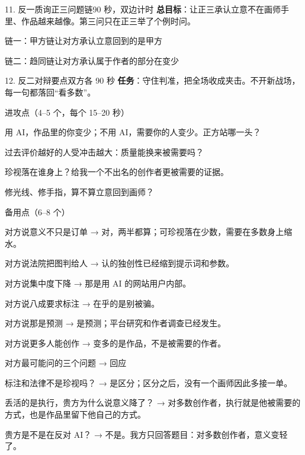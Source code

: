 \documentclass[script,con]{debate}
\begin{document}
\begin{stage}{11. 反一质询正三问题链}{90 秒，双边计时}
\textbf{总目标}：让正三承认立意不在画师手里、作品越来越像。第三问只在正三举了个例时问。
\begin{chain}{链一：甲方链}{让对方承认立意回到的是甲方}
\end{chain}
\begin{chain}{链二：趋同链}{让对方承认属于作者的部分在变少}
\end{chain}
\end{stage}

\begin{stage}{12. 反二对辩要点}{双方各 90 秒}
\textbf{任务}：守住判准，把全场收成夹击。不开新战场，每一句都落回“看多数”。
\begin{points}{进攻点（4–5 个，每个 15–20 秒）}
\item 用 AI，作品里的你变少；不用 AI，需要你的人变少。正方站哪一头？
\item 过去评价越好的人受冲击越大：质量能换来被需要吗？
\item 珍视落在谁身上？给我一个不出名的创作者更被需要的证据。
\item 修光线、修手指，算不算立意回到画师？
\end{points}
\begin{points}{备用点（6–8 个）}
\item 对方说意义不只是订单 → 对，两半都算；可珍视落在少数，需要在多数身上缩水。
\item 对方说法院把图判给人 → 认的独创性已经缩到提示词和参数。
\item 对方说集中度下降 → 那是用 AI 的网站用户内部。
\item 对方说八成要求标注 → 在乎的是别被骗。
\item 对方说那是预测 → 是预测；平台研究和作者调查已经发生。
\item 对方说更多人能创作 → 变多的是作品，不是被需要的作者。
\end{points}
\begin{points}{对方最可能问的三个问题 → 回应}
\item 标注和法律不是珍视吗？ → 是区分；区分之后，没有一个画师因此多接一单。
\item 丢活的是执行，贵方为什么说意义降了？ → 对多数创作者，执行就是他被需要的方式，也是作品里留下他自己的方式。
\item 贵方是不是在反对 AI？ → 不是。我方只回答题目：对多数创作者，意义变轻了。
\end{points}
\end{stage}
\end{document}
